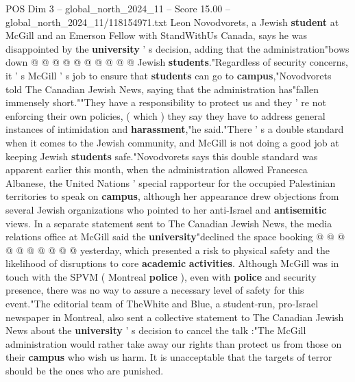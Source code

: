 \begin{textsample}{POS Dim 3 – global\_north\_2024\_11 – Score 15.00 – global\_north\_2024\_11/118154971.txt}
Leon Novodvorets, a Jewish \textbf{student} at McGill and an Emerson Fellow with StandWithUs Canada, says he was disappointed by the \textbf{university} ' s decision, adding that the administration"bows down @ @ @ @ @ @ @ @ @ @ Jewish \textbf{students}."Regardless of security concerns, it ' s McGill ' s job to ensure that \textbf{students} can go to \textbf{campus},"Novodvorets told The Canadian Jewish News, saying that the administration has"fallen immensely short.""They have a responsibility to protect us and they ' re not enforcing their own policies, ( which ) they say they have to address general instances of intimidation and \textbf{harassment},"he said."There ' s a double standard when it comes to the Jewish community, and McGill is not doing a good job at keeping Jewish \textbf{students} safe."Novodvorets says this double standard was apparent earlier this month, when the administration allowed Francesca Albanese, the United Nations ' special rapporteur for the occupied Palestinian territories to speak on \textbf{campus}, although her appearance drew objections from several Jewish organizations who pointed to her anti-Israel and \textbf{antisemitic} views.
In a separate statement sent to The Canadian Jewish News, the media relations office at McGill said the \textbf{university}"declined the space booking @ @ @ @ @ @ @ @ @ @ yesterday, which presented a risk to physical safety and the likelihood of disruptions to core \textbf{academic} \textbf{activities}.
Although McGill was in touch with the SPVM ( Montreal \textbf{police} ), even with \textbf{police} and security presence, there was no way to assure a necessary level of safety for this event."The editorial team of TheWhite and Blue, a student-run, pro-Israel newspaper in Montreal, also sent a collective statement to The Canadian Jewish News about the \textbf{university} ' s decision to cancel the talk :"The McGill administration would rather take away our rights than protect us from those on their \textbf{campus} who wish us harm.
It is unacceptable that the targets of terror should be the ones who are punished.

\end{textsample}
